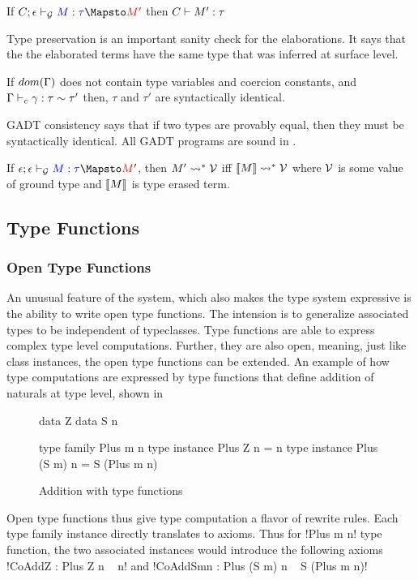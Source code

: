 \documentclass[manuscript,screen,nonacm]{acmart}
\begin{document}
\begin{lemma}
  If $\GTranslate C \empt \Tm \tau {\Tm'}$ then $C \vdash M' : \tau$
\end{lemma}
Type preservation is an important sanity check for the elaborations. It says that the the elaborated terms have the same type that was inferred at surface level.

\begin{theorem}
  If $dom(\Gamma)$ does not contain type variables and coercion constants, and $\Gamma \vdash_{c} \gamma : \tau\sim\tau'$ then, $\tau$ and $\tau'$ are syntactically identical.
\end{theorem}
GADT consistency says that if two types are provably equal, then they must be syntactically identical. All GADT programs are sound in \SFC.

\begin{theorem}
  If $\GTranslate \empt \empt \Tm \tau \Tm'$, then $M' \rightsquigarrow^* \mathcal{V}$ iff $\llbracket M\rrbracket \rightsquigarrow^* \mathcal{V}$ where $\mathcal{V}$ is some value of ground type and $\llbracket M\rrbracket$ is type erased term.
\end{theorem}


\subsection{Type Functions}
\subsubsection{Open Type Functions}
An unusual feature of the system, which also makes the type system expressive is the ability to write open type functions. The intension is to generalize associated types to be independent of typeclasses. Type functions are able to express complex type level computations. Further, they are also open, meaning, just like class instances, the open type functions can be extended. An example of how type computations are expressed by type functions that define addition of naturals at type level, shown in 
\begin{figure}[ht]
  \begin{minipage}[ht]{0.4\linewidth}
    \begin{code}
      data Z
      data S n
    \end{code}
  \end{minipage}%
  \begin{minipage}[ht]{0.4\linewidth}
    \begin{code}
      type family Plus m n
      type instance Plus Z n = n
      type instance Plus (S m) n = S (Plus m n)
    \end{code}
  \end{minipage}
  \caption{Addition with type functions}
  \label{fig:open-type-fun-add}
\end{figure}
Open type functions thus give type computation a flavor of rewrite rules.
Each type family instance directly translates to axioms. Thus for !Plus m n! type function, the two associated instances would introduce the following axioms !CoAddZ : Plus Z n ~ n! and !CoAddSmn : Plus (S m) n ~ S (Plus m n)!
\end{document}
